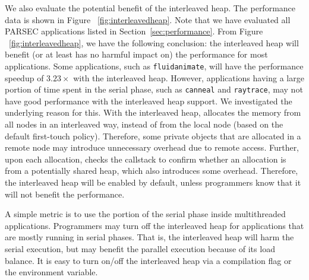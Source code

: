 We also evaluate the potential benefit of the interleaved heap. The performance data is shown in Figure ~\ref{fig:interleavedheap}. Note that we have evaluated all PARSEC applications listed in Section~\ref{sec:performance}.
From Figure ~\ref{fig:interleavedheap}, we have the following conclusion: the interleaved heap will benefit (or at least has no harmful impact on) the performance for most applications. Some applications, such as \texttt{fluidanimate}, will have the performance speedup of $3.23\times$ with the interleaved heap. However, applications having a large portion of time spent in the serial phase, such as \texttt{canneal} and \texttt{raytrace}, may not have good performance with the interleaved heap support. 
We investigated the underlying reason for this. With the interleaved heap, \NM{} allocates the memory from all nodes in an interleaved way, instead of from the local node (based on the default first-touch policy). Therefore, some private objects that are allocated in a remote node may introduce unnecessary overhead due to remote access. Further, upon each allocation, \NM{}  checks the callstack to confirm whether an allocation is from a potentially shared heap, which also introduces some overhead. Therefore, the interleaved heap will be enabled by default, unless programmers know that it will not benefit the performance.

A simple metric is to use the portion of the serial phase inside multithreaded applications.  Programmers may turn off the interleaved heap for applications that are mostly running in serial phases. That is, the interleaved heap will harm the serial execution, but may benefit the parallel execution because of its load balance. It is easy to turn on/off the interleaved heap via a compilation flag or the environment variable.  








